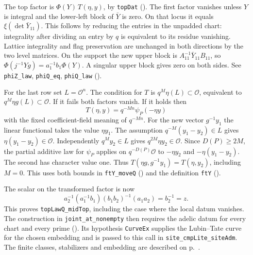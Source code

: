 The top factor is \(\Phi(Y)\,T(\eta,y)\), by \nolinkurl{topDat} (). The first factor vanishes unless \(Y\) is integral and the lower-left block of \(\bar Y\) is zero. On that locus it equals \(\xi(\det\bar Y_{11})\). This follows by reducing the entries in the unpadded chart: integrality after dividing an entry by \(q\) is equivalent to its residue vanishing. Lattice integrality and flag preservation are unchanged in both directions by the two level matrices. On the support the new upper block is \(A_{11}^{-1}\bar Y_{11} B_{11}\), so \(\Phi(j^{-1}Yg)=a_1^{-1}b_1\Phi(Y)\). A singular upper block gives zero on both sides. See \nolinkurl{phiZ_law}, \nolinkurl{phiQ_eq}, \nolinkurl{phiQ_law} ().

For the last row set \(L=\mathcal O^n\). The condition for \(T\) is \(q^M\eta(L)\subset\mathcal O\), equivalent to \(q^M\eta g(L)\subset\mathcal O\). If it fails both factors vanish. If it holds then
\[
 T(\eta,y)=q^{-Mn}\psi_P(-\eta y)
\]
with the fixed coefficient-field meaning of \(q^{-Mn}\). For the new vector \(g^{-1}y_1\) the linear functional takes the value \(\eta y_1\). The assumption \(q^{-M}(y_1-y_2)\in L\) gives \(\eta(y_1-y_2)\in\mathcal O\). Independently \(q^M y_2\in L\) gives \(q^{2M}\eta y_2\in\mathcal O\). Since \(D(P)\ge2M\), the partial additive law for \(\psi_P\) applies on \(q^{-D(P)}\mathcal O\) to \(-\eta y_2\) and \(-\eta(y_1-y_2)\). The second has character value one. Thus \(T(\eta g,g^{-1}y_1)=T(\eta,y_2)\), including \(M=0\). This uses both bounds in \nolinkurl{ftY_moveQ} () and the definition \nolinkurl{ftY} ().

The scalar on the transformed factor is now
\[
 a_2^{-1}(a_1^{-1}b_1)(b_1b_2)^{-1}(a_1a_2)=b_2^{-1}=z.
\]
This proves \nolinkurl{topLawQ_midTop}, including the case where the local datum vanishes. The construction in \nolinkurl{joint_at_nonempty} then requires the adelic datum for every chart and every prime (). Its hypothesis \nolinkurl{CurveEx} supplies the Lubin--Tate curve for the chosen embedding and is passed to this call in \nolinkurl{site_cmpLite_siteAdm}. The finite classes, stabilizers and embedding are described on p.~\pageref{r6:Z4.2.02}.

